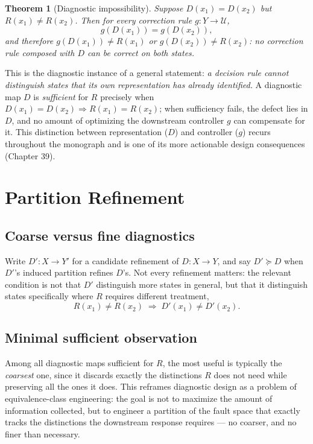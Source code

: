 \documentclass[11pt]{report}
\theoremstyle{definition}
\theoremstyle{plain}
\newtheorem{theorem}[definition]{Theorem}
\newcommand{\Uni}{\mathcal{U}}
\begin{document}
\begin{theorem}[Diagnostic impossibility]
Suppose $D(x_1) = D(x_2)$ but $R(x_1) \neq R(x_2)$. Then for every correction rule $g: Y \to \Uni$,
\[
g(D(x_1)) = g(D(x_2)),
\]
and therefore $g(D(x_1)) \neq R(x_1)$ or $g(D(x_2)) \neq R(x_2)$: no correction rule composed with $D$ can be correct on both states.
\end{theorem}

This is the diagnostic instance of a general statement: \emph{a decision rule cannot distinguish states that its own representation has already identified.} A diagnostic map $D$ is \emph{sufficient} for $R$ precisely when $D(x_1) = D(x_2) \Rightarrow R(x_1) = R(x_2)$; when sufficiency fails, the defect lies in $D$, and no amount of optimizing the downstream controller $g$ can compensate for it. This distinction between representation ($D$) and controller ($g$) recurs throughout the monograph and is one of its more actionable design consequences (Chapter 39).

\chapter{Partition Refinement}

\section{Coarse versus fine diagnostics}
Write $D': X \to Y'$ for a candidate refinement of $D: X \to Y$, and say $D' \succeq D$ when $D'$'s induced partition refines $D$'s. Not every refinement matters: the relevant condition is not that $D'$ distinguish more states in general, but that it distinguish states specifically where $R$ requires different treatment,
\[
R(x_1) \neq R(x_2) \;\Rightarrow\; D'(x_1) \neq D'(x_2).
\]

\section{Minimal sufficient observation}
Among all diagnostic maps sufficient for $R$, the most useful is typically the \emph{coarsest} one, since it discards exactly the distinctions $R$ does not need while preserving all the ones it does. This reframes diagnostic design as a problem of equivalence-class engineering: the goal is not to maximize the amount of information collected, but to engineer a partition of the fault space that exactly tracks the distinctions the downstream response requires --- no coarser, and no finer than necessary.
\end{document}
